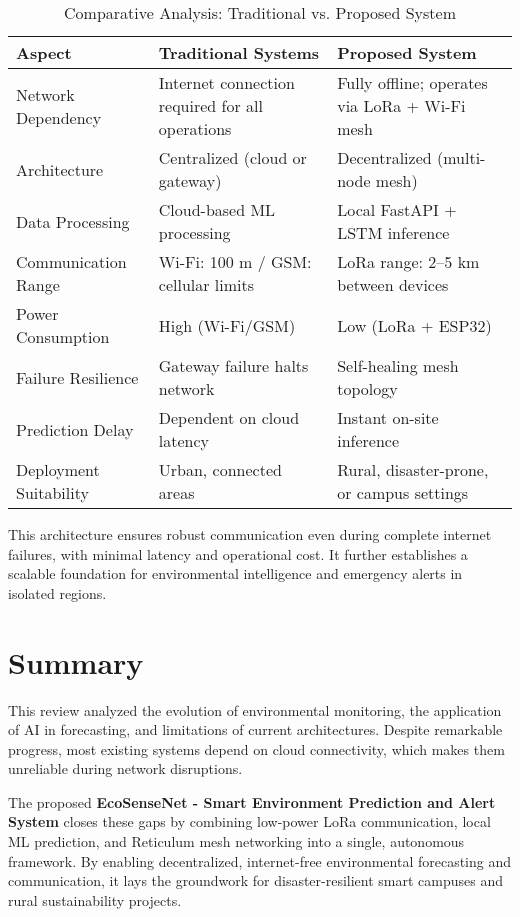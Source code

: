 \begin{table}[H]
\centering
\caption{Comparative Analysis: Traditional vs. Proposed System}
\label{tab:comparison}
\begin{tabular}{|p{4cm}|p{5cm}|p{5cm}|}
\hline
\textbf{Aspect} & \textbf{Traditional Systems} & \textbf{Proposed System} \\
\hline
Network Dependency & Internet connection required for all operations & Fully offline; operates via LoRa + Wi-Fi mesh \\
\hline
Architecture & Centralized (cloud or gateway) & Decentralized (multi-node mesh) \\
\hline
Data Processing & Cloud-based ML processing & Local FastAPI + LSTM inference \\
\hline
Communication Range & Wi-Fi: 100 m / GSM: cellular limits & LoRa range: 2–5 km between devices \\
\hline
Power Consumption & High (Wi-Fi/GSM) & Low (LoRa + ESP32) \\
\hline
Failure Resilience & Gateway failure halts network & Self-healing mesh topology \\
\hline
Prediction Delay & Dependent on cloud latency & Instant on-site inference \\
\hline
Deployment Suitability & Urban, connected areas & Rural, disaster-prone, or campus settings \\
\hline
\end{tabular}
\end{table}

This architecture ensures robust communication even during complete internet failures, with minimal latency and operational cost. It further establishes a scalable foundation for environmental intelligence and emergency alerts in isolated regions.

\section{Summary}

This review analyzed the evolution of environmental monitoring, the application of AI in forecasting, and limitations of current architectures. Despite remarkable progress, most existing systems depend on cloud connectivity, which makes them unreliable during network disruptions.

The proposed \textbf{EcoSenseNet - Smart Environment Prediction and Alert System} closes these gaps by combining low-power LoRa communication, local ML prediction, and Reticulum mesh networking into a single, autonomous framework. By enabling decentralized, internet-free environmental forecasting and communication, it lays the groundwork for disaster-resilient smart campuses and rural sustainability projects.
